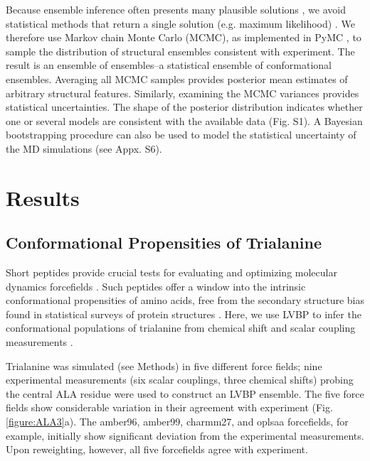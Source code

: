 \documentclass[journal=jacsat,manuscript=article]{achemso}
\begin{document}
Because ensemble inference often presents many plausible solutions \cite{fisher2010, rieping2005}, we avoid statistical methods that return a single solution (e.g. maximum likelihood) .  We therefore use Markov chain Monte Carlo (MCMC), as implemented in PyMC \cite{patil2010pymc}, to sample the distribution of structural ensembles consistent with experiment.  The result is an ensemble of ensembles--a statistical ensemble of conformational ensembles.  Averaging all MCMC samples provides posterior mean  estimates of arbitrary structural features.  Similarly, examining the MCMC variances provides statistical uncertainties.  The shape of the posterior distribution indicates whether one or several models are consistent with the available data (Fig. S1).  A Bayesian bootstrapping procedure \cite{rubin1981} can also be used to model the statistical uncertainty of the MD simulations (see Appx. S6).

\section{Results}

\subsection{Conformational Propensities of Trialanine}

Short peptides provide crucial tests for evaluating and optimizing molecular dynamics forcefields \cite{Graf2007,beauchamp2012protein, Nerenberg2011, Best2008, Grdadolnik2011}.  Such peptides offer a window into the intrinsic conformational propensities of amino acids, free from the secondary structure bias found in statistical surveys of protein structures \cite{Jha2005}.  Here, we use LVBP to infer the conformational populations of trialanine from chemical shift and scalar coupling measurements \cite{Graf2007}.  

Trialanine was simulated (see Methods) in five different force fields; nine experimental measurements (six scalar couplings, three chemical shifts) probing the central ALA residue were used to construct an LVBP ensemble.  The five force fields show considerable variation in their agreement with experiment (Fig. \ref{figure:ALA3}a).  The amber96, amber99, charmm27, and oplsaa forcefields, for example, initially show significant deviation from the experimental measurements.  Upon reweighting, however, all five forcefields agree with experiment.  
\end{document}
